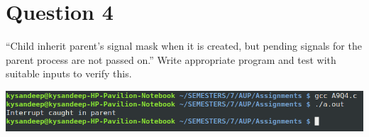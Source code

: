\documentclass[main.tex]{subfiles}
\begin{document}
\section{Question 4}
``Child inherit parent’s signal mask when it is created, but pending signals for
the parent process are not passed on.'' Write appropriate program and test with
suitable inputs to verify this.


\includegraphics[width=\textwidth]{figures/4_output.png}
\end{document}
